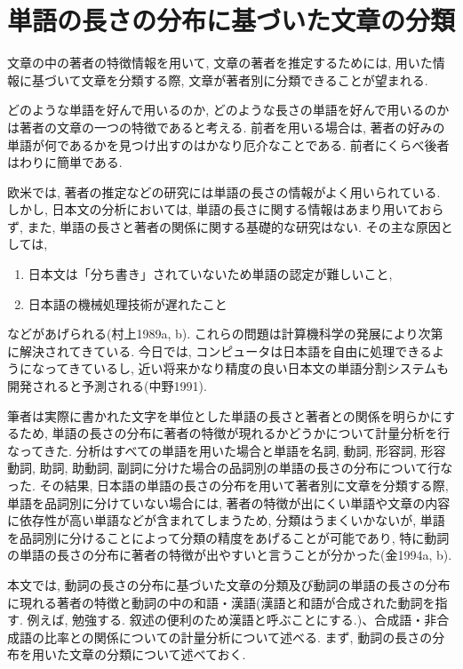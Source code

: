 \section{単語の長さの分布に基づいた文章の分類}

文章の中の著者の特徴情報を用いて, 文章の著者を推定するためには, 用いた情報に基づいて文章を分類する際, 文章が著者別に分類できることが望まれる. 

どのような単語を好んで用いるのか, どのような長さの単語を好んで用いるのかは著者の文章の一つの特徴であると考える. 前者を用いる場合は, 著者の好みの単語が何であるかを見つけ出すのはかなり厄介なことである. 前者にくらべ後者はわりに簡単である. 

欧米では, 著者の推定などの研究には単語の長さの情報がよく用いられている. しかし, 日本文の分析においては, 単語の長さに関する情報はあまり用いておらず, また, 単語の長さと著者の関係に関する基礎的な研究はない. その主な原因としては, 
\begin{enumerate}
\item 日本文は「分ち書き」されていないため単語の認定が難しいこと, 
\item 日本語の機械処理技術が遅れたこと
\end{enumerate}
などがあげられる(村上1989a, b). これらの問題は計算機科学の発展により次第に解決されてきている.  
今日では, コンピュータは日本語を自由に処理できるようになってきているし, 近い将来かなり精度の良い日本文の単語分割システムも開発されると予測される(中野1991).  

筆者は実際に書かれた文字を単位とした単語の長さと著者との関係を明らかにするため, 単語の長さの分布に著者の特徴が現れるかどうかについて計量分析を行なってきた. 
分析はすべての単語を用いた場合と単語を名詞, 動詞, 形容詞, 形容動詞, 助詞, 助動詞, 副詞に分けた場合の品詞別の単語の長さの分布について行なった. その結果, 日本語の単語の長さの分布を用いて著者別に文章を分類する際, 単語を品詞別に分けていない場合には, 著者の特徴が出にくい単語や文章の内容に依存性が高い単語などが含まれてしまうため, 分類はうまくいかないが, 単語を品詞別に分けることによって分類の精度をあげることが可能であり, 特に動詞の単語の長さの分布に著者の特徴が出やすいと言うことが分かった(金1994a, b). 

本文では, 動詞の長さの分布に基づいた文章の分類及び動詞の単語の長さの分布に現れる著者の特徴と動詞の中の和語・漢語(漢語と和語が合成された動詞を指す. 例えば, 勉強する. 叙述の便利のため漢語と呼ぶことにする.)、合成語・非合成語の比率との関係についての計量分析について述べる. まず, 動詞の長さの分布を用いた文章の分類について述べておく.

